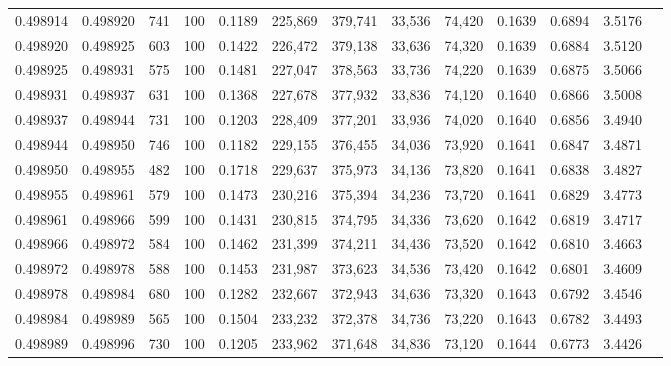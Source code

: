 \begin{tabular}{rrrrrrrrrrrrr}
0.498914 & 0.498920 &   741 & 100 &                                     0.1189 & 225,869 & 379,741 &  33,536 &  74,420 & 0.1639 & 0.6894 & 3.5176 \\
0.498920 & 0.498925 &   603 & 100 &                                     0.1422 & 226,472 & 379,138 &  33,636 &  74,320 & 0.1639 & 0.6884 & 3.5120 \\
0.498925 & 0.498931 &   575 & 100 &                                     0.1481 & 227,047 & 378,563 &  33,736 &  74,220 & 0.1639 & 0.6875 & 3.5066 \\
0.498931 & 0.498937 &   631 & 100 &                                     0.1368 & 227,678 & 377,932 &  33,836 &  74,120 & 0.1640 & 0.6866 & 3.5008 \\
0.498937 & 0.498944 &   731 & 100 &                                     0.1203 & 228,409 & 377,201 &  33,936 &  74,020 & 0.1640 & 0.6856 & 3.4940 \\
0.498944 & 0.498950 &   746 & 100 &                                     0.1182 & 229,155 & 376,455 &  34,036 &  73,920 & 0.1641 & 0.6847 & 3.4871 \\
0.498950 & 0.498955 &   482 & 100 &                                     0.1718 & 229,637 & 375,973 &  34,136 &  73,820 & 0.1641 & 0.6838 & 3.4827 \\
0.498955 & 0.498961 &   579 & 100 &                                     0.1473 & 230,216 & 375,394 &  34,236 &  73,720 & 0.1641 & 0.6829 & 3.4773 \\
0.498961 & 0.498966 &   599 & 100 &                                     0.1431 & 230,815 & 374,795 &  34,336 &  73,620 & 0.1642 & 0.6819 & 3.4717 \\
0.498966 & 0.498972 &   584 & 100 &                                     0.1462 & 231,399 & 374,211 &  34,436 &  73,520 & 0.1642 & 0.6810 & 3.4663 \\
0.498972 & 0.498978 &   588 & 100 &                                     0.1453 & 231,987 & 373,623 &  34,536 &  73,420 & 0.1642 & 0.6801 & 3.4609 \\
0.498978 & 0.498984 &   680 & 100 &                                     0.1282 & 232,667 & 372,943 &  34,636 &  73,320 & 0.1643 & 0.6792 & 3.4546 \\
0.498984 & 0.498989 &   565 & 100 &                                     0.1504 & 233,232 & 372,378 &  34,736 &  73,220 & 0.1643 & 0.6782 & 3.4493 \\
0.498989 & 0.498996 &   730 & 100 &                                     0.1205 & 233,962 & 371,648 &  34,836 &  73,120 & 0.1644 & 0.6773 & 3.4426 \\

\end{tabular}
